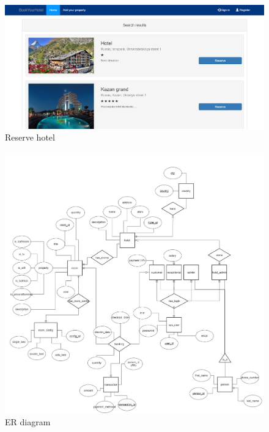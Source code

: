 \documentclass{sig-alternate-05-2015}
\begin{document}
\begin{figure}[h]
\centering
\includegraphics[width=1\linewidth]{reserve}
\caption{Reserve hotel}
\label{reserve}
\end{figure}
\begin{figure}[h]
	\centering
	\includegraphics[width=1\linewidth]{er}
	\caption{ER diagram}
	\label{er}
\end{figure}
\end{document}
